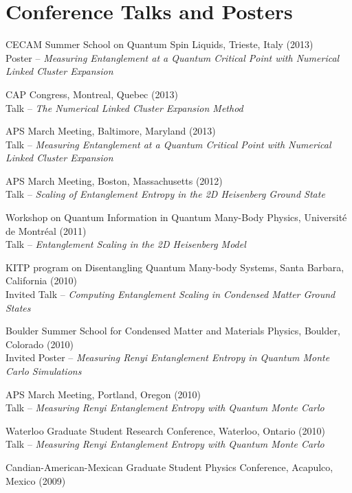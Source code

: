 \documentclass[letterpaper]{article}
\renewenvironment{itemize}{
  \begin{list}{}{
    \setlength{\leftmargin}{1.5em}
  }
}{
  \end{list}
}
\begin{document}
\section*{Conference Talks and Posters}

\begin{itemize}
\item CECAM Summer School on Quantum Spin Liquids, Trieste, Italy (2013) \\
	Poster --  {\it Measuring Entanglement at a Quantum Critical Point with Numerical Linked Cluster Expansion}
\item CAP Congress, Montreal, Quebec (2013) \\
	Talk --  {\it The Numerical Linked Cluster Expansion Method}
\item APS March Meeting, Baltimore, Maryland (2013) \\
	Talk --  {\it Measuring Entanglement at a Quantum Critical Point with Numerical Linked Cluster Expansion}
\item APS March Meeting, Boston, Massachusetts (2012) \\
	Talk --  {\it Scaling of Entanglement Entropy in the 2D Heisenberg Ground State}
\item Workshop on Quantum Information in Quantum Many-Body Physics, Universit\'e de Montr\'eal  (2011) \\ Talk --  {\it Entanglement Scaling in the 2D Heisenberg Model}
\item KITP program on Disentangling Quantum Many-body Systems, Santa Barbara, California (2010) \\
 	Invited Talk -- {\it Computing Entanglement Scaling in Condensed Matter Ground States}
\item Boulder Summer School for Condensed Matter and Materials Physics, Boulder, Colorado (2010)\\
	Invited Poster -- {\it Measuring Renyi Entanglement Entropy in Quantum Monte Carlo Simulations}
\item APS March Meeting, Portland, Oregon (2010) \\
	Talk --  {\it Measuring Renyi Entanglement Entropy with Quantum Monte Carlo}
\item Waterloo Graduate Student Research Conference, Waterloo, Ontario (2010) \\
	Talk --  {\it Measuring Renyi Entanglement Entropy with Quantum Monte Carlo}
\item Candian-American-Mexican Graduate Student Physics Conference, Acapulco, Mexico (2009) \\

\end{itemize}
\end{document}
